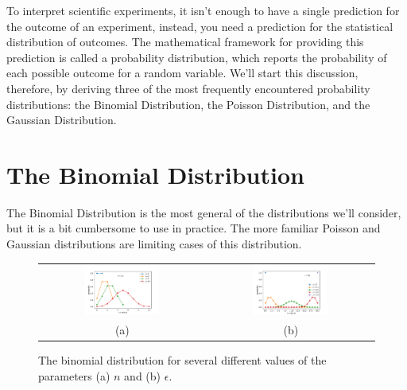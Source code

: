 \documentclass[12pt,oneside]{book}
\begin{document}
To interpret scientific experiments, it isn't enough to have a single
prediction for the outcome of an experiment, instead, you need a
prediction for the statistical distribution of outcomes.  The
mathematical framework for providing this prediction is called a
probability distribution, which reports the probability of each
possible outcome for a random variable.  We'll start this discussion,
therefore, by deriving three of the most frequently encountered
probability distributions: the Binomial Distribution, the Poisson
Distribution, and the Gaussian Distribution.


\section{The  Binomial Distribution}

The Binomial Distribution is the most general of the distributions
we'll consider, but it is a bit cumbersome to use in practice.  The
more familiar Poisson and Gaussian distributions are limiting cases of
this distribution.

\begin{figure}[htbp]
\begin{center}
\begin{tabular}{cc}
{\includegraphics[width=0.47\textwidth]{figs/binom_n.pdf}} &
{\includegraphics[width=0.47\textwidth]{figs/binom_eps.pdf}} \\
(a) & (b) \\
\end{tabular}
\end{center}
\caption{\label{fig:binom} The binomial distribution for several different values of the parameters (a) $n$ and (b) $\epsilon$.}
\end{figure}
\end{document}
